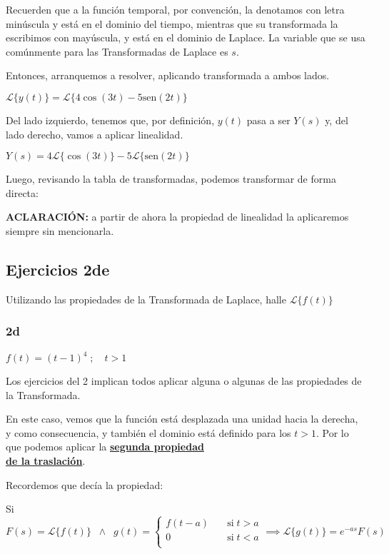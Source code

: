\documentclass[11pt]{article}
\def\sen{\mathrm{sen}}
\newcommand{\lapl}[1]{\mathscr{L} \lbrace {#1} \rbrace}
\begin{document}
	Recuerden que a la función temporal, por convención, la denotamos con letra minúscula y está en el dominio del tiempo, mientras que su transformada la escribimos con mayúscula, y está en el dominio de Laplace. La variable que se usa comúnmente para las Transformadas de Laplace es $s$.
	
	Entonces, arranquemos a resolver, aplicando transformada a ambos lados.
	
	$\displaystyle \lapl{y(t)}=\lapl{4\cos\left(3t\right) - 5\sen\left(2t\right)}$
	
	Del lado izquierdo, tenemos que, por definición, $y(t)$ pasa a ser $Y(s)$ y, del lado derecho, vamos a aplicar linealidad.
	
	$\displaystyle Y(s)=4\lapl{\cos\left(3t\right)}-5\lapl{\sen\left(2t\right)}$
	
	Luego, revisando la tabla de transformadas, podemos transformar de forma directa:
	
	
	\textbf{ACLARACIÓN:} a partir de ahora la propiedad de linealidad la aplicaremos siempre sin mencionarla.
	
	\subsection{Ejercicios 2de}
	Utilizando las propiedades de la Transformada de Laplace, halle $\lapl{f(t)}$
	
	\subsubsection{2d}
	$f(t)=\left(t-1\right)^{4}\; ;\quad t>1$
	
	Los ejercicios del 2 implican todos aplicar alguna o algunas de las propiedades de la Transformada.
	
	En este caso, vemos que la función está desplazada una unidad hacia la derecha, y como consecuencia, y también el dominio está definido para los $t>1$. Por lo que podemos aplicar la \textbf{\underline{segunda propiedad}}\\
	\textbf{\underline{de la traslación}}.
	
	Recordemos que decía la propiedad:
	
	Si $ \displaystyle
	F(s)=\lapl{f(t)}\;\; \wedge\;\; 
	g(t) = 
	\begin{cases}
		f(t-a) &\quad\text{si}\; t > a\\
		0 &\quad\text{si}\; t < a \\
	\end{cases}
	\implies \lapl{g(t)}=e^{-as}F(s)$
	
\end{document}
